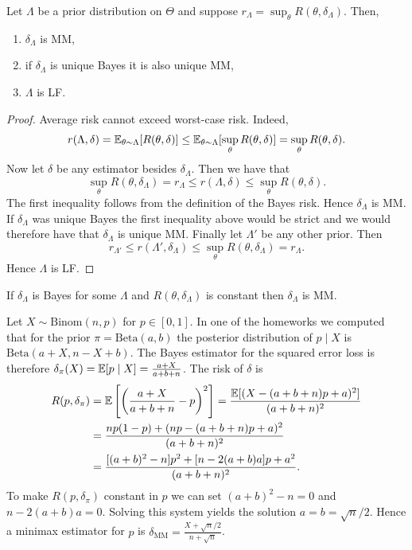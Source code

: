\begin{theorem}
Let $\Lambda$ be a prior distribution on $\Theta$ and suppose $r_\Lambda = \sup_\theta R(\theta, \delta_\Lambda)$. Then, \begin{enumerate}
	\item[(i)] $\delta_\Lambda$ is MM,
	\item[(ii)] if $\delta_\Lambda$ is unique Bayes it is also unique MM,
	\item[(iii)] $\Lambda$ is LF.

\end{enumerate}
\end{theorem}

\begin{proof}
Average risk cannot exceed worst-case risk. Indeed, \[
	r(\Lambda, \delta) = \mathbb{E}_{\theta \sim \Lambda}[R(\theta, \delta)] \leq \mathbb{E}_{\theta \sim \Lambda}[\sup_\theta R(\theta, \delta)] = \sup_\theta R(\theta, \delta).
\]
Now let $\delta$ be any estimator besides $\delta_\Lambda$. Then we have that $$\sup_\theta R(\theta, \delta_\Lambda) = r_\Lambda \leq r(\Lambda, \delta) \leq \sup_\theta R(\theta, \delta).$$ The first inequality follows from the definition of the Bayes risk.  Hence $\delta_\Lambda$ is MM. If $\delta_\Lambda$ was unique Bayes the first inequality above would be strict and we would therefore have that $\delta_\Lambda$ is unique MM. Finally let $\Lambda'$ be any other prior. Then $$
r_{\Lambda'} \leq r(\Lambda', \delta_\Lambda) \leq \sup_\theta R(\theta, \delta_\Lambda) = r_\Lambda.
$$ Hence $\Lambda$ is LF.
\end{proof}

\begin{corollary}
	If $\delta_\Lambda$ is Bayes for some $\Lambda$ and $R(\theta, \delta_\Lambda)$ is constant then $\delta_\Lambda$ is MM.
\end{corollary}

\begin{example}
	Let $X \sim \text{Binom}(n, p)$ for $p \in [0, 1]$. In one of the homeworks we computed that for the prior $\pi = \text{Beta}(a, b)$ the posterior distribution of $p \mid X$ is  $\text{Beta}(a + X, n - X + b)$. The Bayes estimator for the squared error loss is therefore $\delta_\pi(X) = \mathbb{E}[p \mid X] = \frac{a+X}{a + b + n}$. The risk of $\delta$ is \begin{align*}
		R(p, \delta_\pi) &= \mathbb{E} \left[\left(\frac{a+X}{a + b + n} - p\right)^2\right] = \frac{ \mathbb{E}[(X - (a+b+n)p + a)^2] }{(a + b + n)^2} \\
		&= \frac{np(1-p) + (np - (a+b+n)p + a)^2}{(a + b + n)^2} \\
		&= 	\frac{[(a+b)^2 - n]p^2 + [n- 2(a+b)a]p + a^2}{(a + b + n)^2}.
	\end{align*} To make $R(p, \delta_\pi)$ constant in $p$ we can set $(a+b)^2 - n = 0$ and $n- 2(a+b)a = 0$. Solving this system yields the solution $a = b = \sqrt{n}/2$. Hence a minimax estimator for $p$ is $\delta_{\text{MM}} = \frac{X + \sqrt{n}/2}{n + \sqrt{n}}$.
\end{example}

